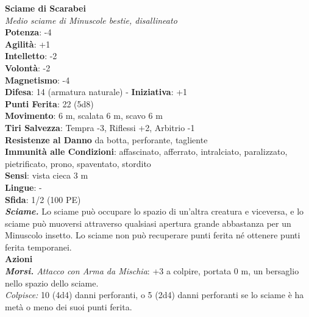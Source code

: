 \begin{multicols}{2}
\medskip\textbf{Sciame di Scarabei}\\
\emph{Medio sciame di Minuscole bestie, disallineato}\\
\textbf{Potenza}: -4\\
\textbf{Agilità}: +1\\
\textbf{Intelletto}: -2\\
\textbf{Volontà}: -2\\
\textbf{Magnetismo}: -4\\
\textbf{Difesa}: 14 (armatura naturale) - \textbf{Iniziativa}: +1\\
\textbf{Punti Ferita}: 22 (5d8)\\
\textbf{Movimento}: 6 m, scalata 6 m, scavo 6 m\\
\textbf{Tiri Salvezza}: Tempra -3, Riflessi +2, Arbitrio -1\\
\textbf{Resistenze al Danno} da botta, perforante, tagliente\\
\textbf{Immunità alle Condizioni}: affascinato, afferrato, intralciato, paralizzato, pietrificato, prono, spaventato, stordito\\
\textbf{Sensi}: vista cieca 3 m\\
\textbf{Lingue}: -\\
\textbf{Sfida}: 1/2 (100 PE)\smallskip\\
\emph{\textbf{Sciame.}} Lo sciame può occupare lo spazio di un'altra creatura e viceversa, e lo sciame può muoversi attraverso qualsiasi apertura grande abbastanza per un Minuscolo insetto. Lo sciame non può recuperare punti ferita né ottenere punti ferita temporanei.\\
\smallskip\textbf{Azioni}\\
\emph{\textbf{Morsi.} Attacco con Arma da Mischia}: +3 a colpire, portata 0 m, un bersaglio nello spazio dello sciame.\\
\emph{Colpisce:} 10 (4d4) danni perforanti, o 5 (2d4) danni perforanti se lo sciame è ha metà o meno dei suoi punti ferita.\\


\end{multicols}
